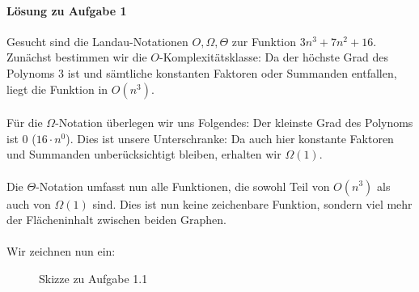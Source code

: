 \documentclass[11pt,a4paper]{scrartcl}
\begin{document}
\paragraph{Lösung zu Aufgabe 1} \label{a1:lsg}Gesucht sind die Landau-Notationen $O, \Omega, \Theta$ zur Funktion $3n^3 + 7n^2 + 16$. Zunächst bestimmen wir die $O$-Komplexitätsklasse: Da der höchste Grad des Polynoms $3$ ist und sämtliche konstanten Faktoren oder Summanden entfallen, liegt die Funktion in $O(n^3)$. \\\\Für die $\Omega$-Notation überlegen wir uns Folgendes: Der kleinste Grad des Polynoms ist $0$ ($16 \cdot n^0$). Dies ist unsere Unterschranke: Da auch hier konstante Faktoren und Summanden unberücksichtigt bleiben, erhalten wir $\Omega(1)$. \\\\Die $\Theta$-Notation umfasst nun alle Funktionen, die sowohl Teil von $O(n^3)$ als auch von $\Omega(1)$ sind. Dies ist nun keine zeichenbare Funktion, sondern viel mehr der Flächeninhalt zwischen beiden Graphen. \\\\Wir zeichnen nun ein:
\begin{figure}[h]
\centering
{}
\caption{Skizze zu Aufgabe 1.1}
\end{figure}
\end{document}

